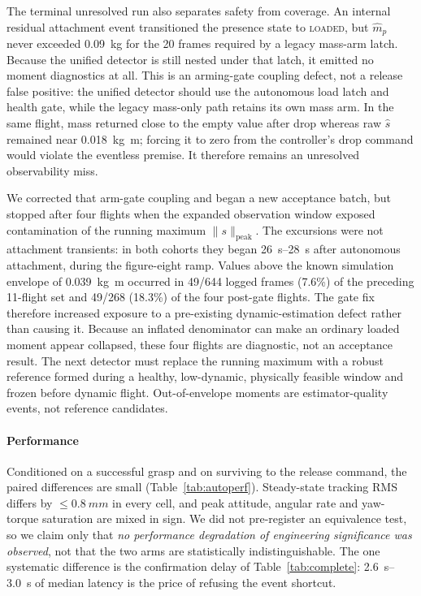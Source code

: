 The terminal unresolved run also separates safety from coverage. An internal residual attachment
event transitioned the presence state to \textsc{loaded}, but $\hat m_p$ never exceeded
\SI{0.09}{kg} for the 20 frames required by a legacy mass-arm latch. Because the unified detector
is still nested under that latch, it emitted no moment diagnostics at all. This is an arming-gate
coupling defect, not a release false positive: the unified detector should use the autonomous
load latch and health gate, while the legacy mass-only path retains its own mass arm. In the same
flight, mass returned close to the empty value after drop whereas raw $\hat s$ remained near
\SI{0.018}{kg.m}; forcing it to zero from the controller's drop command would violate the eventless
premise. It therefore remains an unresolved observability miss.

We corrected that arm-gate coupling and began a new acceptance batch, but stopped after four
flights when the expanded observation window exposed contamination of the running maximum
$\lVert s\rVert_{\mathrm{peak}}$. The excursions were not attachment transients: in both cohorts
they began \SIrange{26}{28}{s} after autonomous attachment, during the figure-eight ramp. Values
above the known simulation envelope of \SI{0.039}{kg.m} occurred in 49/644 logged frames (7.6\%)
of the preceding 11-flight set and 49/268 (18.3\%) of the four post-gate flights. The gate fix
therefore increased exposure to a pre-existing dynamic-estimation defect rather than causing it.
Because an inflated denominator can make an ordinary loaded moment appear collapsed, these four
flights are diagnostic, not an acceptance result. The next detector must replace the running
maximum with a robust reference formed during a healthy, low-dynamic, physically feasible window
and frozen before dynamic flight. Out-of-envelope moments are estimator-quality events, not
reference candidates.

\paragraph{Performance} Conditioned on a successful grasp and on surviving to the release
command, the paired differences are small (Table~\ref{tab:autoperf}). Steady-state tracking
RMS differs by ${\le}\SI{0.8}{mm}$ in every cell, and peak attitude, angular rate and yaw-torque
saturation are mixed in sign. We did not pre-register an equivalence test, so we claim only
that \emph{no performance degradation of engineering significance was observed}, not that the
two arms are statistically indistinguishable. The one systematic difference is the
confirmation delay of Table~\ref{tab:complete}: \SIrange{2.6}{3.0}{s} of median latency is the
price of refusing the event shortcut.

